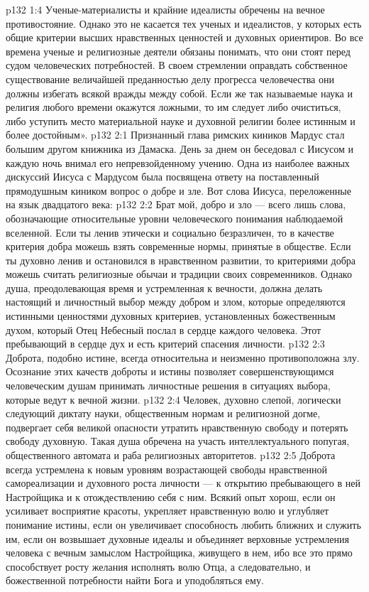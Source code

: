 \vs p132 1:4 Ученые\hyp{}материалисты и крайние идеалисты обречены на вечное противостояние. Однако это не касается тех ученых и идеалистов, у которых есть общие критерии высших нравственных ценностей и духовных ориентиров. Во все времена ученые и религиозные деятели обязаны понимать, что они стоят перед судом человеческих потребностей. В своем стремлении оправдать собственное существование величайшей преданностью делу прогресса человечества они должны избегать всякой вражды между собой. Если же так называемые наука и религия любого времени окажутся ложными, то им следует либо очиститься, либо уступить место материальной науке и духовной религии более истинным и более достойным».
\vs p132 2:1 Признанный глава римских киников Мардус стал большим другом книжника из Дамаска. День за днем он беседовал с Иисусом и каждую ночь внимал его непревзойденному учению. Одна из наиболее важных дискуссий Иисуса с Мардусом была посвящена ответу на поставленный прямодушным киником вопрос о добре и зле. Вот слова Иисуса, переложенные на язык двадцатого века:
\vs p132 2:2 \pc Брат мой, добро и зло --- всего лишь слова, обозначающие относительные уровни человеческого понимания наблюдаемой вселенной. Если ты ленив этически и социально безразличен, то в качестве критерия добра можешь взять современные нормы, принятые в обществе. Если ты духовно ленив и остановился в нравственном развитии, то критериями добра можешь считать религиозные обычаи и традиции своих современников. Однако душа, преодолевающая время и устремленная к вечности, должна делать настоящий и личностный выбор между добром и злом, которые определяются истинными ценностями духовных критериев, установленных божественным духом, который Отец Небесный послал в сердце каждого человека. Этот пребывающий в сердце дух и есть критерий спасения личности.
\vs p132 2:3 Доброта, подобно истине, всегда относительна и неизменно противоположна злу. Осознание этих качеств доброты и истины позволяет совершенствующимся человеческим душам принимать личностные решения в ситуациях выбора, которые ведут к вечной жизни.
\vs p132 2:4 Человек, духовно слепой, логически следующий диктату науки, общественным нормам и религиозной догме, подвергает себя великой опасности утратить нравственную свободу и потерять свободу духовную. Такая душа обречена на участь интеллектуального попугая, общественного автомата и раба религиозных авторитетов.
\vs p132 2:5 Доброта всегда устремлена к новым уровням возрастающей свободы нравственной самореализации и духовного роста личности --- к открытию пребывающего в ней Настройщика и к отождествлению себя с ним. Всякий опыт хорош, если он усиливает восприятие красоты, укрепляет нравственную волю и углубляет понимание истины, если он увеличивает способность любить ближних и служить им, если он возвышает духовные идеалы и объединяет верховные устремления человека с вечным замыслом Настройщика, живущего в нем, ибо все это прямо способствует росту желания исполнять волю Отца, а следовательно, и божественной потребности найти Бога и уподобляться ему.
